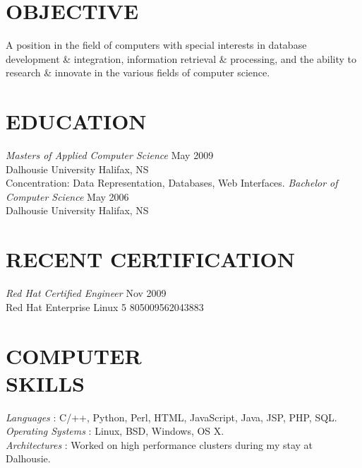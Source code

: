 \documentclass[line,margin]{res}
\begin{document}
\address{3139 Veith Street, Halifax, NS B3K 3G9}
\address{(902) 489-2557 or (902) 444-4974}


\begin{resume}

\section{OBJECTIVE}
    A position in the field of computers with special
    interests in database development {\&} integration,
    information retrieval {\&} processing, and the ability to
    research {\&} innovate in the various fields of computer
    science.


\section{EDUCATION}
    {\sl Masters of Applied Computer Science} \hfill May 2009\\
        Dalhousie University \hfill Halifax, NS\\
        Concentration: Data Representation, Databases,
        Web Interfaces.  \medskip
    \newline
    {\sl Bachelor of Computer Science} \hfill May 2006\\
        Dalhousie University \hfill Halifax, NS

\section{RECENT CERTIFICATION}
    {\sl Red Hat Certified Engineer} \hfill Nov 2009\\
        Red Hat Enterprise Linux 5 \hfill 805009562043883\\

\section{COMPUTER \\ SKILLS}
    {\sl Languages \hspace{35pt}}:
     C/++, Python, Perl, HTML, JavaScript, Java, JSP, PHP, SQL.\\
    {\sl Operating Systems }:
     Linux, BSD, Windows, OS X. \\
    {\sl Architectures \hspace{27pt}}:
     Worked on high performance clusters during my stay at \\
     \hspace*{92pt} Dalhousie.


\end{resume}
\end{document}
